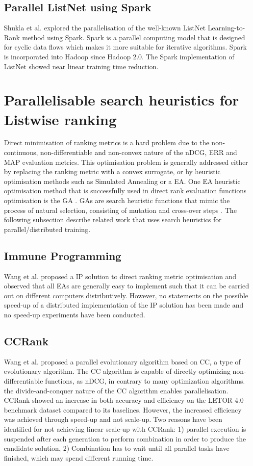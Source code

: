 \subsection{Parallel ListNet using Spark}
Shukla et al. \cite{Shukla2012} explored the parallelisation of the well-known ListNet Learning-to-Rank method using Spark. Spark is a parallel computing model that is designed for cyclic data flows which makes it more suitable for iterative algorithms. Spark is incorporated into Hadoop since Hadoop 2.0. The Spark implementation of ListNet showed near linear training time reduction.\\

\section{Parallelisable search heuristics for Listwise ranking}
Direct minimisation of ranking metrics is a hard problem due to the non-continuous, non-differentiable and non-convex nature of the \ac{nDCG}, \ac{ERR} and \ac{MAP} evaluation metrics. This optimisation problem is generally addressed either by replacing the ranking metric with a convex surrogate, or by heuristic optimisation methods such as Simulated Annealing or a \ac{EA}. One \ac{EA} heuristic optimisation method that is successfully used in direct rank evaluation functions optimisation is the \ac{GA} \cite{Yeh2007}. \ac{GA}s are search heuristic functions that mimic the process of natural selection, consisting of mutation and cross-over steps \cite{Holland1995}. The following subsection describe related work that uses search heuristics for parallel/distributed training.
\subsection{Immune Programming}
Wang et al. \cite{Wang2009b} proposed a \ac{IP} solution to direct ranking metric optimisation and observed that all \ac{EA}s are generally easy to implement such that it can be carried out on different computers distributively. However, no statements on the possible speed-up of a distributed implementation of the \ac{IP} solution has been made and no speed-up experiments have been conducted.
\subsection{CCRank}
Wang et al. \cite{Wang2011a,Wang2011b} proposed a parallel evolutionary algorithm based on \ac{CC}, a type of evolutionary algorithm. The \ac{CC} algorithm is capable of directly optimizing non-differentiable functions, as \ac{nDCG}, in contrary to many optimization algorithms.  the divide-and-conquer nature of the \ac{CC} algorithm enables parallelisation. CCRank showed an increase in both accuracy and efficiency on the LETOR 4.0 benchmark dataset compared to its baselines. However, the increased efficiency was achieved through speed-up and not scale-up. Two reasons have been identified for not achieving linear scale-up with CCRank: 1) parallel execution is suspended after each generation to perform combination in order to produce the candidate solution, 2) Combination has to wait until all parallel tasks have finished, which may spend different running time.
